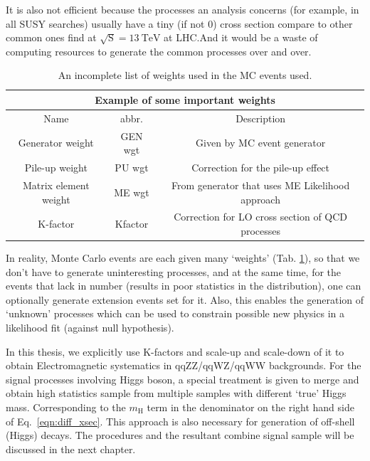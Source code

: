 It is also not efficient because the processes an analysis concerns (for example, in all SUSY
searches) usually have a tiny (if not 0) cross section compare to other common ones find at
$\sqrt{\mathrm{S}} = \SI{13}{\tera\electronvolt}$ at LHC.\@ And it would be a waste of
computing resources to generate the common processes over and over.

\begin{table}[]
\centering
\begin{tabular}{|c|c|c|}
\hline
\multicolumn{3}{|c|}{Example of some important weights}                                                                                       \\ \hline
Name                  & abbr.   & Description                                                                                                 \\ \hline
Generator weight      & GEN wgt & Given by MC event generator                                                                                 \\ \hline
Pile-up weight        & PU wgt  & Correction for the pile-up effect                                                                           \\ \hline
Matrix element weight & ME wgt  & From generator that uses ME Likelihood approach \\ \hline
K-factor              & Kfactor & Correction for LO cross section of QCD processes                                                         \\ \hline
\end{tabular}
\caption{An incomplete list of weights used in the MC events used.}
\label{tab:MC_wgts}
\end{table}

In reality, Monte Carlo events are each given many `weights' (Tab. \ref{tab:MC_wgts}), so that
we don't have to generate uninteresting processes, and at the same time, for the events that lack
in number (results in poor statistics in the distribution), one can optionally generate
extension events set for it. Also, this enables the generation of `unknown' processes which can
be used to constrain possible new physics in a likelihood fit (against null hypothesis).

In this thesis, we explicitly use K-factors and scale-up and scale-down of it to 
obtain Electromagnetic systematics in qqZZ/qqWZ/qqWW backgrounds. For the signal processes involving
Higgs boson, a special treatment is given to merge and obtain high statistics sample from
multiple samples with different `true' Higgs mass. Corresponding to the $m_\mathrm{H}$ term
in the denominator on the right hand side of Eq.~\ref{eqn:diff_xsec}.
This approach is also necessary for generation of off-shell (Higgs) decays. The procedures 
and the resultant combine signal sample will be discussed in the next chapter.
